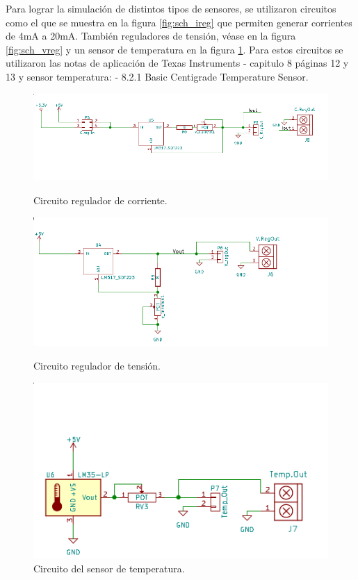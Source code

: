 Para lograr la simulación de distintos tipos de sensores, se utilizaron circuitos como el que se muestra en la figura \ref{fig:sch_ireg}  que permiten generar corrientes de 4mA a 20mA.
También reguladores de tensión, véase en la figura \ref{fig:sch_vreg} y un sensor de temperatura en la figura \ref{fig:sch_lm35}. Para estos circuitos se utilizaron las notas de aplicación de Texas Instruments\citep{Texas:LM317} - capitulo 8 páginas 12 y 13 y sensor temperatura: \citep{Texas:LM35} - 8.2.1 Basic Centigrade Temperature Sensor. 
\begin{figure}[!hp]
  \centering
  \includegraphics[scale=0.5]{./Figures/sch_ireg.png}
  \caption{Circuito regulador de corriente.}
  \label{fig:sch_ireg}
  \includegraphics[scale=0.5]{./Figures/sch_vreg.png}
  \caption{Circuito regulador de tensión.}
  \label{fig:sch_vreg}
  \includegraphics[scale=0.5]{./Figures/sch_lm35.png}
  \caption{Circuito del sensor de temperatura.}
  \label{fig:sch_lm35}
\end{figure}

